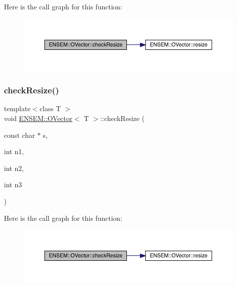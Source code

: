 Here is the call graph for this function\+:
\nopagebreak
\begin{figure}[H]
\begin{center}
\leavevmode
\includegraphics[width=350pt]{d0/d8d/classENSEM_1_1OVector_ac909025f6c5d78479f5dcbef8151d571_cgraph}
\end{center}
\end{figure}
\mbox{\label{classENSEM_1_1OVector_ac909025f6c5d78479f5dcbef8151d571}} 
\subsubsection{\texorpdfstring{checkResize()}{checkResize()}\hspace{0.1cm}{\footnotesize\ttfamily [6/6]}}
{\footnotesize\ttfamily template$<$class T $>$ \\
void \mbox{\hyperlink{classENSEM_1_1OVector}{E\+N\+S\+E\+M\+::\+O\+Vector}}$<$ T $>$\+::check\+Resize (\begin{DoxyParamCaption}\item[{const char $\ast$}]{s,  }\item[{int}]{n1,  }\item[{int}]{n2,  }\item[{int}]{n3 }\end{DoxyParamCaption})\hspace{0.3cm}{\ttfamily [inline]}}

Here is the call graph for this function\+:
\nopagebreak
\begin{figure}[H]
\begin{center}
\leavevmode
\includegraphics[width=350pt]{d0/d8d/classENSEM_1_1OVector_ac909025f6c5d78479f5dcbef8151d571_cgraph}
\end{center}
\end{figure}
\mbox{\label{classENSEM_1_1OVector_a12d09a71bb2808a7404578da9ba41c4f}} 
